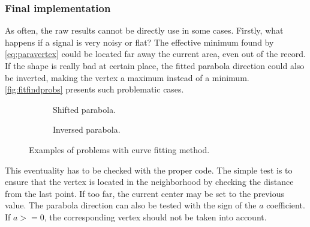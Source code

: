 \subsubsection{Final implementation}

As often, the raw results cannot be directly use in some cases. Firstly, what happens if a signal is very noisy or flat? The effective minimum found by \eqref{eq:paravertex} could be located far away the current area, even out of the record. If the shape is really bad at certain place, the fitted parabola direction could also be inverted, making the vertex a maximum instead of a minimum. \autoref{fig:fitfindprobs} presents such problematic cases.

\begin{figure}[!ht]
\centering
    \begin{subfigure}[t]{0.45\textwidth}
    \centering
    \caption{Shifted parabola.}
    \label{fig:fitfinddist}
    \end{subfigure}
    \begin{subfigure}[t]{0.45\textwidth}
    \centering
    \caption{Inversed parabola.}
    \label{fig:fitfindmax}
    \end{subfigure}
    \caption{Examples of problems with curve fitting method.}
    \label{fig:fitfindprobs}
\end{figure}

This eventuality has to be checked with the proper code. The simple test is to ensure that the vertex is located in the neighborhood by checking the distance from the last point. If too far, the current center may be set to the previous value. The parabola direction can also be tested with the sign of the $a$ coefficient. If $a >= 0$, the corresponding vertex should not be taken into account.

